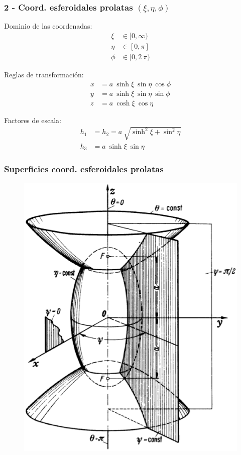 \documentclass[12pt]{beamer}
\begin{document}
\begin{frame}
\frametitle{2 - Coord. esferoidales prolatas $(\xi, \eta, \phi)$}
\fontsize{12}{12}\selectfont
\begin{minipage}{0.45\textwidth}
Dominio de las coordenadas:
\pause
\begin{align*}
\xi &\in [0, \infty) \\
\eta &\in [0, \pi] \\
\phi &\in [0, 2 \: \pi)
\end{align*}
\end{minipage}
\hspace{1cm}
\pause
\begin{minipage}{0.4\textwidth}
Reglas de transformación:
\pause
\begin{align*}
x &= a \: \sinh \xi \: \sin \eta \: \cos \phi\\
y &= a \: \sinh \xi \: \sin \eta \: \sin \phi\\
z &= a \: \cosh \xi \: \cos \eta
\end{align*}
\end{minipage}

Factores de escala:
\pause
\begin{align*}
h_{1} &= h_{2} = a \: \sqrt{\sinh^{2} \xi + \sin^{2} \eta} \\
h_{3 }&= a \: \sinh \xi \: \sin \eta
\end{align*}
\end{frame}
\begin{frame}
\frametitle{Superficies coord. esferoidales prolatas}
\begin{figure}[H]
  \centering
  \includegraphics[scale=0.3]{Imagenes/Sistema_Esfeoridal_Prolato.eps}
\end{figure}
\end{frame}
\end{document}
